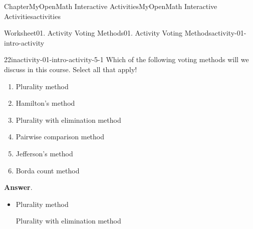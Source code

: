 \documentclass[oneside,10pt,]{book}
\newcommand{\blocktitlefont}{\relax}
\newcommand{\ptxlistdisc}{\raisebox{0.3ex}{\textbullet}}
\newlength{\fillinmaxwidth}
\newlength{\fillincontract}
\newlength{\charmaxwidth}\setlength{\charmaxwidth}{0.5em}
\newlength{\charminwidth}\setlength{\charminwidth}{0.1em}
\newlength{\fillinheight}
\newcommand{\fillintext}[1]{%
\setlength{\fillinmaxwidth}{#1\charmaxwidth}%
\setlength{\fillincontract}{#1\charminwidth}%
\setlength{\fillinheight}{\baselineskip}\addtolength{\fillinheight}{1.2pt}%
\strut\nobreak\leaders\vbox{\hrule width 0.3pt height 0.3pt \vskip -1.2pt}\hskip 1\fillinmaxwidth minus \fillincontract\nobreak\strut%
}
\begin{document}
\begin{chapterptx}{Chapter}{MyOpenMath Interactive Activities}{}{MyOpenMath Interactive Activities}{}{}{activities}
\begin{worksheet-section}{Worksheet}{01. Activity Voting Methods}{}{01. Activity Voting Methods}{}{}{activity-01-intro-activity}
%
\clearpage
\begin{divisionexercise}{2}{}{2in}{activity-01-intro-activity-5-1}%
Which of the following voting methods will we discuss in this course. Select all that apply!%
\par
%
\begin{enumerate}[label={(\alph*)}]
\item{}Plurality method%
\item{}Hamilton's method%
\item{}Plurality with elimination method%
\item{}Pairwise comparison method%
\item{}Jefferson's method%
\item{}Borda count method%
\end{enumerate}
%
\par\smallskip%
\noindent\textbf{\blocktitlefont Answer}.\hypertarget{activity-01-intro-activity-5-1-2}{}\quad{}%
\begin{itemize}[label=\ptxlistdisc]
\item{}Plurality method%
\par
Plurality with elimination method%
\par

\end{itemize}
\end{divisionexercise}
\end{worksheet-section}
\end{chapterptx}
\end{document}

